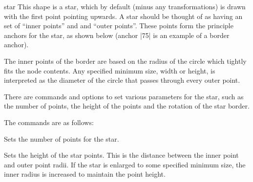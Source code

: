 \begin{shape}{star}
  This shape is a star, which by default (minus any transformations) is
  drawn with the first point pointing	upwards.
  A star should be thought of as having an set of ``inner points'' and
  and ``outer points''. These points form the principle anchors for the
  star, as shown below (anchor |75| is an example of a border anchor).
  
\begin{codeexample}[]
\Huge
{}
\end{codeexample}

  The inner points of the border are based on the radius of the circle
  which tightly fits the node contents. 
  Any specified minimum size, width or height, is interpreted as the 
  diameter of the circle that passes through every outer point. 
  
  There are \pgfname{} commands and \tikzname{} options to set various
  parameters for the star, such as the number of points, the height of
  the points and the rotation of the star border. 
  
  The \pgfname{} commands are as follows:
  
  \begin{command}{\pgfsetstarpoints{}}
    Sets the number of points for the star.
  \end{command}
  
  \begin{command}{\pgfsetstarpointheight{}}
    Sets the height of the star points. This is the distance between the
    inner point and outer point radii. If the star is enlarged to some
    specified minimum size, the inner radius is increased to maintain
    the point height.	
  \end{command}
  

\end{shape}
